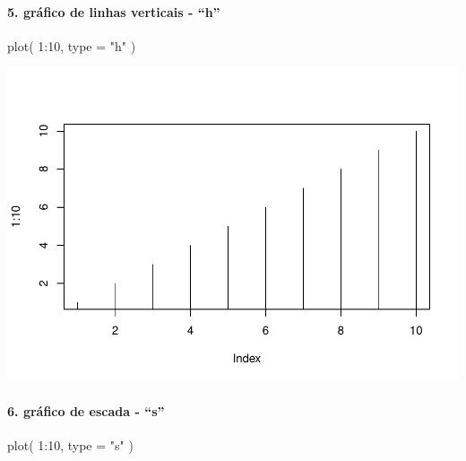 \documentclass[
]{article}
\newenvironment{Shaded}{\begin{snugshade}}{\end{snugshade}}
\newcommand{\AttributeTok}[1]{\textcolor[rgb]{0.77,0.63,0.00}{#1}}
\newcommand{\DecValTok}[1]{\textcolor[rgb]{0.00,0.00,0.81}{#1}}
\newcommand{\FunctionTok}[1]{\textcolor[rgb]{0.00,0.00,0.00}{#1}}
\newcommand{\NormalTok}[1]{#1}
\newcommand{\SpecialCharTok}[1]{\textcolor[rgb]{0.00,0.00,0.00}{#1}}
\newcommand{\StringTok}[1]{\textcolor[rgb]{0.31,0.60,0.02}{#1}}
\begin{document}
\hypertarget{gruxe1fico-de-linhas-verticais---h}{%
\paragraph{5. gráfico de linhas verticais -
``h''}\label{gruxe1fico-de-linhas-verticais---h}}

\begin{Shaded}
\begin{Highlighting}[]
\FunctionTok{plot}\NormalTok{( }\DecValTok{1}\SpecialCharTok{:}\DecValTok{10}\NormalTok{, }\AttributeTok{type =} \StringTok{"h"}\NormalTok{ )}
\end{Highlighting}
\end{Shaded}

\includegraphics{presencial_função_plot_04_turma_B_files/figure-latex/unnamed-chunk-6-1.pdf}

\hypertarget{gruxe1fico-de-escada---s}{%
\paragraph{6. gráfico de escada -
``s''}\label{gruxe1fico-de-escada---s}}

\begin{Shaded}
\begin{Highlighting}[]
\FunctionTok{plot}\NormalTok{( }\DecValTok{1}\SpecialCharTok{:}\DecValTok{10}\NormalTok{, }\AttributeTok{type =} \StringTok{"s"}\NormalTok{ )}
\end{Highlighting}
\end{Shaded}
\end{document}
